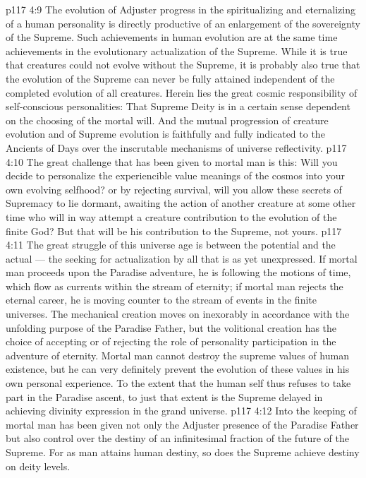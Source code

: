 \vs p117 4:9 The evolution of Adjuster progress in the spiritualizing and eternalizing of a human personality is directly productive of an enlargement of the sovereignty of the Supreme. Such achievements in human evolution are at the same time achievements in the evolutionary actualization of the Supreme. While it is true that creatures could not evolve without the Supreme, it is probably also true that the evolution of the Supreme can never be fully attained independent of the completed evolution of all creatures. Herein lies the great cosmic responsibility of self\hyp{}conscious personalities: That Supreme Deity is in a certain sense dependent on the choosing of the mortal will. And the mutual progression of creature evolution and of Supreme evolution is faithfully and fully indicated to the Ancients of Days over the inscrutable mechanisms of universe reflectivity.
\vs p117 4:10 The great challenge that has been given to mortal man is this: Will you decide to personalize the experiencible value meanings of the cosmos into your own evolving selfhood? or by rejecting survival, will you allow these secrets of Supremacy to lie dormant, awaiting the action of another creature at some other time who will in  way attempt a creature contribution to the evolution of the finite God? But that will be his contribution to the Supreme, not yours.
\vs p117 4:11 \pc The great struggle of this universe age is between the potential and the actual --- the seeking for actualization by all that is as yet unexpressed. If mortal man proceeds upon the Paradise adventure, he is following the motions of time, which flow as currents within the stream of eternity; if mortal man rejects the eternal career, he is moving counter to the stream of events in the finite universes. The mechanical creation moves on inexorably in accordance with the unfolding purpose of the Paradise Father, but the volitional creation has the choice of accepting or of rejecting the role of personality participation in the adventure of eternity. Mortal man cannot destroy the supreme values of human existence, but he can very definitely prevent the evolution of these values in his own personal experience. To the extent that the human self thus refuses to take part in the Paradise ascent, to just that extent is the Supreme delayed in achieving divinity expression in the grand universe.
\vs p117 4:12 Into the keeping of mortal man has been given not only the Adjuster presence of the Paradise Father but also control over the destiny of an infinitesimal fraction of the future of the Supreme. For as man attains human destiny, so does the Supreme achieve destiny on deity levels.

